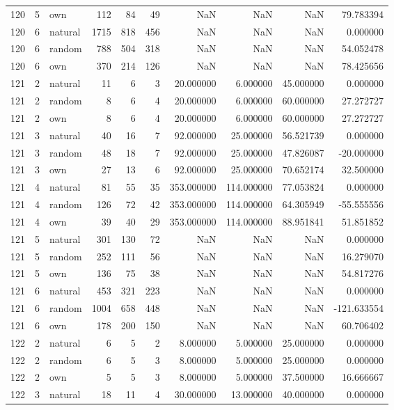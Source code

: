 \begin{table}[htbp]
\begin{tabular}{rrlrrrrrrr}
120 & 5 & own & 112 & 84 & 49 & NaN & NaN & NaN & 79.783394 \\
120 & 6 & natural & 1715 & 818 & 456 & NaN & NaN & NaN & 0.000000 \\
120 & 6 & random & 788 & 504 & 318 & NaN & NaN & NaN & 54.052478 \\
120 & 6 & own & 370 & 214 & 126 & NaN & NaN & NaN & 78.425656 \\
121 & 2 & natural & 11 & 6 & 3 & 20.000000 & 6.000000 & 45.000000 & 0.000000 \\
121 & 2 & random & 8 & 6 & 4 & 20.000000 & 6.000000 & 60.000000 & 27.272727 \\
121 & 2 & own & 8 & 6 & 4 & 20.000000 & 6.000000 & 60.000000 & 27.272727 \\
121 & 3 & natural & 40 & 16 & 7 & 92.000000 & 25.000000 & 56.521739 & 0.000000 \\
121 & 3 & random & 48 & 18 & 7 & 92.000000 & 25.000000 & 47.826087 & -20.000000 \\
121 & 3 & own & 27 & 13 & 6 & 92.000000 & 25.000000 & 70.652174 & 32.500000 \\
121 & 4 & natural & 81 & 55 & 35 & 353.000000 & 114.000000 & 77.053824 & 0.000000 \\
121 & 4 & random & 126 & 72 & 42 & 353.000000 & 114.000000 & 64.305949 & -55.555556 \\
121 & 4 & own & 39 & 40 & 29 & 353.000000 & 114.000000 & 88.951841 & 51.851852 \\
121 & 5 & natural & 301 & 130 & 72 & NaN & NaN & NaN & 0.000000 \\
121 & 5 & random & 252 & 111 & 56 & NaN & NaN & NaN & 16.279070 \\
121 & 5 & own & 136 & 75 & 38 & NaN & NaN & NaN & 54.817276 \\
121 & 6 & natural & 453 & 321 & 223 & NaN & NaN & NaN & 0.000000 \\
121 & 6 & random & 1004 & 658 & 448 & NaN & NaN & NaN & -121.633554 \\
121 & 6 & own & 178 & 200 & 150 & NaN & NaN & NaN & 60.706402 \\
122 & 2 & natural & 6 & 5 & 2 & 8.000000 & 5.000000 & 25.000000 & 0.000000 \\
122 & 2 & random & 6 & 5 & 3 & 8.000000 & 5.000000 & 25.000000 & 0.000000 \\
122 & 2 & own & 5 & 5 & 3 & 8.000000 & 5.000000 & 37.500000 & 16.666667 \\
122 & 3 & natural & 18 & 11 & 4 & 30.000000 & 13.000000 & 40.000000 & 0.000000 \\

\end{tabular}
\end{table}
